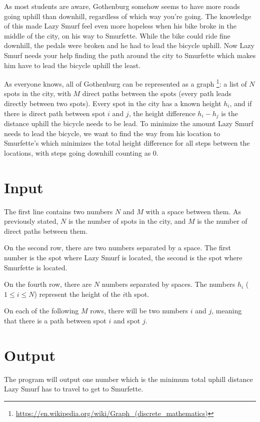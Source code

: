 
As most students are aware, Gothenburg somehow seems to have more roads going uphill than downhill,
regardless of which way you're going. The knowledge of this made Lazy Smurf feel even more hopeless
when his bike broke in the middle of the city, on his way to Smurfette. While the bike could ride
fine downhill, the pedals were broken and he had to lead the bicycle uphill. Now Lazy Smurf needs
your help finding the path around the city to Smurfette which makes him have to lead the bicycle
uphill the least.

As everyone knows, all of Gothenburg can be represented as a graph
\footnote{\url{https://en.wikipedia.org/wiki/Graph_(discrete_mathematics)}}:
a list of $N$ spots in the city, with $M$ direct paths
between the spots (every path leads directly between two spots). Every spot in the city has a known
height $h_i$, and if there is direct path between spot $i$ and $j$, the height difference $h_i-h_j$
is the distance uphill the bicycle needs to be lead. To minimize the amount Lazy Smurf needs to lead
the bicycle, we want to find the way from his location to Smurfette's which minimizes the total
height difference for all steps between the locations, with steps going downhill counting as 0.

\section*{Input}
The first line contains two numbers $N$ and $M$ with a space between them. As previously stated, $N$
is the number of spots in the city, and $M$ is the number of direct paths between them.

On the second row, there are two numbers separated by a space. The first number is the spot where
Lazy Smurf is located, the second is the spot where Smurfette is located.

On the fourth row, there are $N$ numbers separated by spaces. The numbers $h_i$ ($1 \le i \le N$)
represent the height of the $i$th spot.

On each of the following $M$ rows, there will be two numbers $i$ and $j$, meaning that there is a
path between spot $i$ and spot $j$.

\section*{Output}

The program will output one number which is the minimum total uphill distance Lazy Smurf has to
travel to get to Smurfette.

